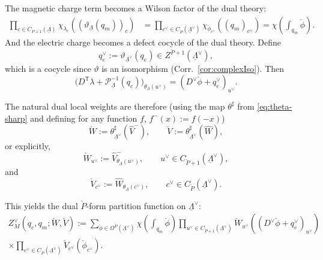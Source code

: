 The magnetic charge term becomes a Wilson factor of the dual theory:
\begin{align}
	\prod_{c\in C_{P+1}(\underline\Lambda)}
	\chi_{\lambda_c} \left((\vartheta_{\underline\Lambda}(q_m))_c\right)
	&=
	\prod_{c^\vee\in C_{\check P}(\underline\Lambda^\vee)}
	\chi_{\check\phi_{c^\vee}} \left((q_m)_{c^\vee}\right)
	=
	\chi \left(\int_{q_m}\check\phi\right).
	\label{eq:KW-magnetic-to-dual-Wilson}
\end{align}
And the electric charge becomes a defect cocycle of the dual theory. Define
\begin{equation}
	q_e^\vee := \vartheta_{\underline\Lambda^\vee}(q_e)\in Z^{\check P+1}(\underline\Lambda^\vee),
\end{equation}
which is a cocycle since $\vartheta$ is an isomorphism (Corr.~\ref{cor:complexIso}). Then
\begin{equation}
	\bigl(D^{\mathsf T}\lambda+\mathcal P_{\underline\Lambda}^{-1}(q_e)\bigr)_{\theta_{\underline\Lambda}(u^\vee)}
	=
	\left(D^\vee\check\phi+q_e^\vee\right)_{u^\vee}.
	\label{eq:KW-electric-to-dual-defect}
\end{equation}

The natural dual local weights are therefore (using the map $\theta^\sharp$ from \eqref{eq:theta-sharp} and defining for any function $f$, $f^{-}(x):=f(-x)$)
\begin{equation}
	\check W := \theta_{\underline\Lambda^\vee}^\sharp(\widehat V^{-}),
	\qquad
	\check V := \theta_{\underline\Lambda^\vee}^\sharp(\widehat W),
\end{equation}
or explicitly,
\begin{equation}
	\check W_{u^\vee}
	:=
	\widehat V^{-}_{\theta_{\underline\Lambda}(u^\vee)},
	\qquad
	u^\vee\in C_{\check P+1}(\underline\Lambda^\vee),
	\label{eq:KW-dual-W}
\end{equation}
and
\begin{equation}
	\check V_{c^\vee}
	:=
	\widehat W_{\theta_{\underline\Lambda}(c^\vee)},
	\qquad
	c^\vee\in C_{\check P}(\underline\Lambda^\vee).
	\label{eq:KW-dual-V}
\end{equation}

This yields the dual \(\check P\)-form partition function on \(\underline\Lambda^\vee\):
\begin{equation}
	\begin{aligned}
		Z_M^\vee(q_e,q_m;\check W,\check V)
		:=
		\sum_{\check\phi\in \Omega^{\check P}(\underline\Lambda^\vee)}
		\chi \left(\int_{q_m}\check\phi\right)
		\prod_{u^\vee\in C_{\check P+1}(\underline\Lambda^\vee)}
		\check W_{u^\vee} \left((D^\vee\check\phi+q_e^\vee)_{u^\vee}\right)
		\\
		\times
		\prod_{c^\vee\in C_{\check P}(\underline\Lambda^\vee)}
		\check V_{c^\vee}(\check\phi_{c^\vee}).
	\end{aligned}
	\label{eq:KW-dual-raw-fixed-charge}
\end{equation}




